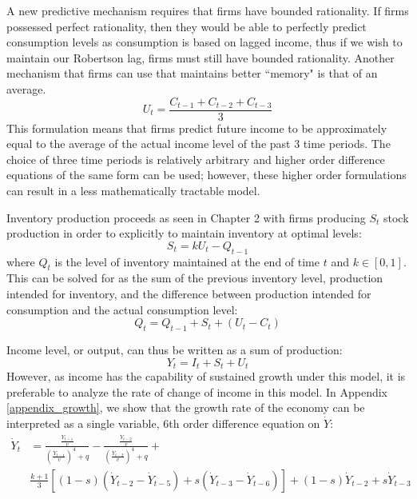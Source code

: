 A new predictive mechanism requires that firms have bounded rationality. If firms possessed perfect rationality, then they would be able to perfectly predict consumption levels as consumption is based on lagged income, thus if we wish to maintain our Robertson lag, firms must still have bounded rationality. Another mechanism that firms can use that maintains better ``memory" is that of an average. 
\begin{equation}\label{predict}
    U_t = \frac{C_{t-1}+C_{t-2}+C_{t-3}}{3}
\end{equation}
This formulation means that firms predict future income to be approximately equal to the average of the actual income level of the past 3 time periods. The choice of three time periods is relatively arbitrary and higher order difference equations of the same form can be used; however, these higher order formulations can result in a less mathematically tractable model.

Inventory production proceeds as seen in Chapter 2 with firms producing $S_t$ stock production in order to explicitly to maintain inventory at optimal levels:
\begin{equation}
    S_t = k U_t-Q_{t-1}
\end{equation}
where $Q_t$ is the level of inventory maintained at the end of time $t$ and $k\in[0,1]$. This can be solved for as the sum of the previous inventory level, production intended for inventory, and the difference between production intended for consumption and the actual consumption level:
\begin{equation}
    Q_t=Q_{t-1}+S_t+(U_t-C_t)
\end{equation}

Income level, or output, can thus be written as a sum of production:
\begin{equation}\label{eq:Income}
    Y_t=I_t+S_t+U_t
\end{equation}
However, as income has the capability of sustained growth under this model, it is preferable to analyze the rate of change of income in this model. In Appendix \ref{appendix_growth}, we show that the growth rate of the economy can be interpreted as a single variable, 6th order difference equation on $\dot Y$:
\begin{equation}
    \begin{split}
        \dot Y_{t}& = \frac{\frac{\dot Y_{t-1}}{v}}{\left(\frac{\dot Y_{t-1}}{v}\right)^4+q}-\frac{\frac{\dot Y_{t-2}}{v}}{\left(\frac{\dot Y_{t-2}}{v}\right)^4+q} + \\
        & \frac{k+1}{3}\left[(1-s)(\dot Y_{t-2}-\dot Y_{t-5})+s(\dot Y_{t-3}-\dot Y_{t-6})\right]+(1-s)\dot Y_{t-2}+s\dot Y_{t-3}
    \end{split}
    \end{equation}

